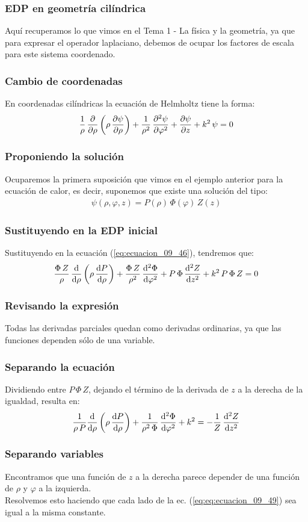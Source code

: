 \documentclass[12pt]{beamer}
\begin{document}
\begin{frame}
\frametitle{EDP en geometría cilíndrica}
Aquí recuperamos lo que vimos en el Tema 1 - La física y la geometría, ya que para expresar el operador laplaciano, debemos de ocupar los factores de escala para este sistema coordenado.
\end{frame}
\begin{frame}
\frametitle{Cambio de coordenadas}
En coordenadas cilíndricas la ecuación de Helmholtz tiene la forma:
\pause
\begin{align}
\dfrac{1}{\rho} \, \pdv{\rho} \left( \rho \, \pdv{\psi}{\rho} \right) + \dfrac{1}{\rho^{2}} \, \pdv[2]{\psi}{\varphi} + \pdv{\psi}{z} + k^{2} \, \psi = 0
\label{eq:ecuacion_09_46}
\end{align}
\end{frame}
\begin{frame}
\frametitle{Proponiendo la solución}
Ocuparemos la primera suposición que vimos en el ejemplo anterior para la ecuación de calor, es decir, suponemos que existe una solución del tipo:
\pause
\begin{align}
\psi (\rho, \varphi, z) = P(\rho) \, \Phi (\varphi) \, Z(z)
\label{eq:ecuacion_09_47}
\end{align}
\end{frame}
\begin{frame}
\frametitle{Sustituyendo en la EDP inicial}
Sustituyendo en la ecuación (\ref{eq:ecuacion_09_46}), tendremos que:
\pause
\begin{align}
\dfrac{\Phi \, Z}{\rho} \, \dv{\rho} \left( \rho \, \dv{P}{\rho} \right) + \dfrac{\Phi \, Z}{\rho^{2}} \, \dv[2]{\Phi}{\varphi} + P \, \Phi \, \dv[2]{Z}{z} + k^{2} \, P \, \Phi \, Z = 0 
\label{eq:ecuacion_09_48}    
\end{align}
\end{frame}
\begin{frame}
\frametitle{Revisando la expresión}
Todas las derivadas parciales quedan como derivadas ordinarias, ya que las funciones dependen sólo de una variable. 
\end{frame}
\begin{frame}
\frametitle{Separando la ecuación}
Dividiendo entre $P \, \Phi \, Z$, dejando el término de la derivada de $z$ a la derecha de la igualdad, resulta en:
\pause
\begin{align}
\dfrac{1}{\rho \, P} \dv{\rho} \left( \rho \, \dv{P}{\rho} \right) + \dfrac{1}{\rho^{2} \, \Phi} \, \dv[2]{\Phi}{\varphi} + k^{2} =  - \dfrac{1}{Z} \, \dv[2]{Z}{z}
\label{eq:eq:ecuacion_09_49}
\end{align}
\end{frame}
\begin{frame}
\frametitle{Separando variables}
Encontramos que una función de $z$ a la derecha parece depender de una función de $\rho$ y $\varphi$ a la izquierda.
\\
\bigskip
\pause
Resolvemos esto haciendo que cada lado de la ec. (\ref{eq:eq:ecuacion_09_49}) sea igual a la misma constante. 
\end{frame}
\end{document}
